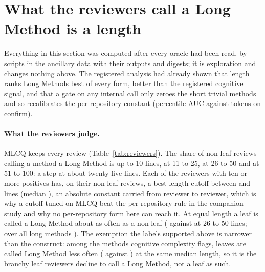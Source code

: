 \documentclass[11pt,a4paper]{article}
\newcommand{\fitwidth}[1]{\resizebox{\ifdim\width>\textwidth\textwidth\else\width\fi}{!}{#1}}
\begin{document}
\section{What the reviewers call a Long Method is a length}
\label{sec:length}

Everything in this section was computed after every oracle had been read,
by scripts in the ancillary data with their outputs and digests; it is
exploration and changes nothing above. The registered analysis had already
shown that length ranks Long Methods best of every form, better than the
registered cognitive signal, and that a gate on any internal call only
zeroes the short trivial methods and so recalibrates the per-repository
constant (percentile AUC against tokens
\matchedGatePctVsTokensConfirm{} on confirm).

\begin{table}[t]
\centering
\caption{Post hoc: MLCQ's \revLongReviews{} individual Long Method reviews
by \revReviewers{} reviewers on measured units (both halves), by the
method's length and whether it is a leaf (no internal call): the share
calling it a Long Method at any severity.}
\label{tab:reviewers}
\small
\setlength{\tabcolsep}{4pt}
\fitwidth{}
\end{table}

\paragraph{What the reviewers judge.} MLCQ keeps every review
(Table~\ref{tab:reviewers}). The share of non-leaf reviews calling a method
a Long Method is \revNonLeafTenRate{} up to 10 lines,
\revNonLeafTwentyFiveRate{} at 11 to 25, \revNonLeafFiftyRate{} at 26 to 50
and \revNonLeafHundredRate{} at 51 to 100: a step at about twenty-five
lines. Each of the \revCutoffReviewers{} reviewers with ten or more
positives has, on their non-leaf reviews, a best length cutoff between
\revCutoffMin{} and \revCutoffMax{} lines (median \revCutoffMedian{}), an
absolute constant
carried from reviewer to reviewer, which is why a cutoff tuned on MLCQ beat
the per-repository rule in the companion study and why no per-repository
form here can reach it. At equal length a leaf is called
a Long Method about as often as a non-leaf (\revLeafFiftyRate{} against
\revNonLeafFiftyRate{} at 26 to 50 lines; over all long methods
\revLongLeafMinusNonLeaf{}). The exemption the labels supported above is
narrower than the construct: among the methods cognitive complexity flags,
leaves are called Long Method less often (\revFlaggedLeafRate{} against
\revFlaggedRestRate{}) at the same median length, so it is the branchy
leaf reviewers decline to call a Long Method, not a leaf as such.
\end{document}
